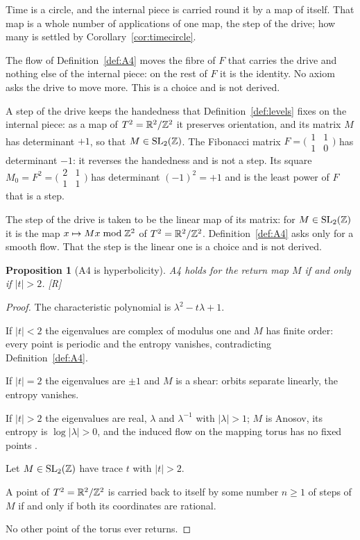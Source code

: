 \documentclass[11pt,a4paper]{article}
\theoremstyle{plain}
\newtheorem{proposition}[theorem]{Proposition}
\theoremstyle{definition}
\theoremstyle{remark}
\newcommand{\rigR}{[\textup{R}]}
\begin{document}
Time is a circle, and the internal piece is carried round it by a map of itself. That map is a whole number of applications of one map, the step of the drive; how many is settled by Corollary~\ref{cor:timecircle}.

The flow of Definition~\ref{def:A4} moves the fibre of $F$ that carries the drive and nothing else of the internal piece: on the rest of $F$ it is the identity. No axiom asks the drive to move more. This is a choice and is not derived.

A step of the drive keeps the handedness that Definition~\ref{def:levels} fixes on the internal piece: as a map of $T^2=\mathbb{R}^{2}/\mathbb{Z}^{2}$ it preserves orientation, and its matrix $M$ has determinant $+1$, so that $M\in\mathrm{SL}_{2}(\mathbb{Z})$. The Fibonacci matrix $F=\bigl(\begin{smallmatrix}1&1\\1&0\end{smallmatrix}\bigr)$ has determinant $-1$: it reverses the handedness and is not a step. Its square $M_{0}=F^{2}=\bigl(\begin{smallmatrix}2&1\\1&1\end{smallmatrix}\bigr)$ has determinant $(-1)^{2}=+1$ and is the least power of $F$ that is a step.

The step of the drive is taken to be the linear map of its matrix: for $M\in\mathrm{SL}_{2}(\mathbb{Z})$ it is the map $x\mapsto Mx \bmod \mathbb{Z}^{2}$ of $T^2=\mathbb{R}^{2}/\mathbb{Z}^{2}$. Definition~\ref{def:A4} asks only for a smooth flow. That the step is the linear one is a choice and is not derived.

\begin{proposition}[A4 is hyperbolicity]\label{prop:hyp}
A4 holds for the return map $M$ if and only if $\lvert t\rvert>2$. \rigR
\end{proposition}

\begin{proof}
The characteristic polynomial is $\lambda^{2}-t\lambda+1$.

If $\lvert t\rvert<2$ the eigenvalues are complex of modulus one and $M$ has finite order: every point is periodic and the entropy vanishes, contradicting Definition~\ref{def:A4}.

If $\lvert t\rvert=2$ the eigenvalues are $\pm1$ and $M$ is a shear: orbits separate linearly, the entropy vanishes.

If $\lvert t\rvert>2$ the eigenvalues are real, $\lambda$ and $\lambda^{-1}$ with $\lvert\lambda\rvert>1$; $M$ is Anosov, its entropy is $\log\lvert\lambda\rvert>0$, and the induced flow on the mapping torus has no fixed points \cite{KatokHasselblatt}.

Let $M\in\mathrm{SL}_{2}(\mathbb{Z})$ have trace $t$ with $\lvert t\rvert>2$.

A point of $T^2=\mathbb{R}^{2}/\mathbb{Z}^{2}$ is carried back to itself by some number $n\ge1$ of steps of $M$ if and only if both its coordinates are rational.

No other point of the torus ever returns.
\end{proof}
\end{document}

